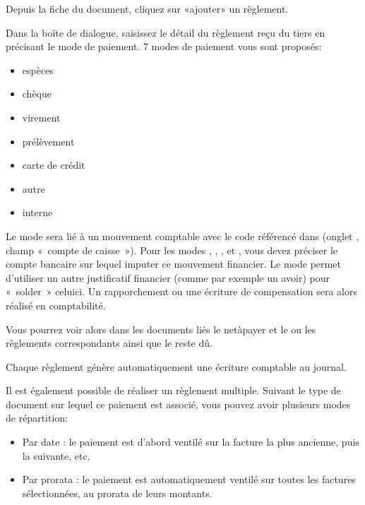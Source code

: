 \documentclass[a4paper,10pt,oneside,french]{sphinxmanual}
\begin{document}
Depuis la fiche du document, cliquez sur «ajouter» un règlement.
\begin{quote}

\noindent{}
\end{quote}

Dans la boîte de dialogue, saisissez le détail du règlement reçu du tiers en précisant le mode de paiement.
7 modes de paiement vous sont proposés:
\begin{itemize}
\item {} 
espèces

\item {} 
chèque

\item {} 
virement

\item {} 
prélèvement

\item {} 
carte de crédit

\item {} 
autre

\item {} 
interne

\end{itemize}

Le mode  sera lié à un mouvement comptable avec le code référencé dans  (onglet , champ « compte de caisse »).
Pour les modes , , ,  et , vous devez préciser le compte bancaire sur lequel imputer ce mouvement financier.
Le mode  permet d’utiliser un autre justificatif financier (comme par exemple un avoir) pour « solder » celui\sphinxhyphen{}ci. Un rapporchement ou une écriture de compensation sera alors réalisé en comptabilité.

Vous pourrez voir alors dans les documents liés le net\sphinxhyphen{}à\sphinxhyphen{}payer et le ou les règlements correspondants ainsi que le reste dû.

Chaque règlement génère automatiquement une écriture comptable au journal.

Il est également possible de réaliser un règlement multiple.
Suivant le type de document sur lequel ce paiement est associé, vous pouvez avoir plusieurs modes de répartition:
\begin{itemize}
\item {} 
Par date : le paiement est d’abord ventilé sur la facture la plus ancienne, puis la suivante, etc.

\item {} 
Par prorata : le paiement est automatiquement ventilé sur toutes les factures sélectionnées, au prorata de leurs montants.
\begin{quote}

\noindent{}
\end{quote}

\end{itemize}
\end{document}
